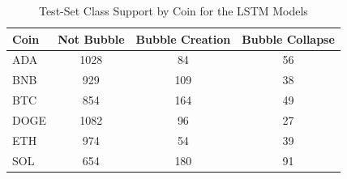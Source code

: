 \documentclass[12pt,a4paper]{article}
\begin{document}
\begin{table} [h]
\centering
\small
\caption{Test-Set Class Support by Coin for the LSTM Models}
\label{tab:lstm_support}
\begin{tabular}{lccc}
\toprule
Coin & Not Bubble & Bubble Creation & Bubble Collapse \\
\midrule
ADA  & 1028 & 84  & 56 \\
BNB  & 929  & 109 & 38 \\
BTC  & 854  & 164 & 49 \\
DOGE & 1082 & 96  & 27 \\
ETH  & 974  & 54  & 39 \\
SOL  & 654  & 180 & 91 \\
\bottomrule
\end{tabular}
\end{table}
\end{document}
